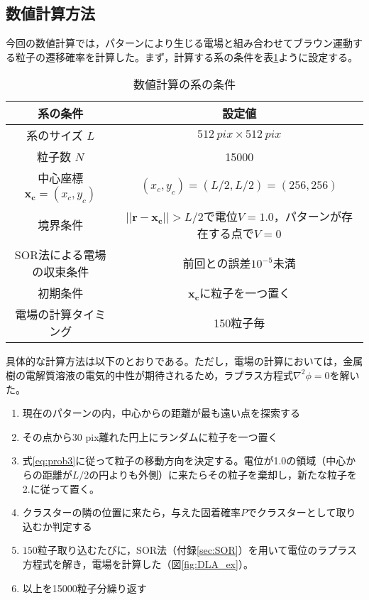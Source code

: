 \documentclass[autodetect-engine,dvi=dvipdfmx,a4paper,ja=standard,oneside,openany,11pt,draft]{bxjsbook}
\begin{document}
\subsection{数値計算方法}
今回の数値計算では，パターンにより生じる電場と組み合わせてブラウン運動する粒子の遷移確率を計算した。まず，計算する系の条件を表\ref{tab:condition}ように設定する。
\begin{table}[htbp]
  \centering
  \caption{数値計算の系の条件　}
  \begin{tabular}{|c||c|}
    \hline
    系の条件                      & 設定値                                                  \\ \hline\hline
    系のサイズ $L$                 & $\SI{512}{pix}\times\SI{512}{pix}$                   \\ \hline
    粒子数 $N$                   & 15000                                                \\ \hline
    中心座標 $\bm{x_c}=(x_c,y_c)$ & $(x_c,y_c)=(L/2,L/2)=(256,256)$                      \\ \hline
    境界条件                      & $||\bm{r}-\bm{x_c}||>L/2$で電位$V=1.0$，パターンが存在する点で$V=0$ \\ \hline
    SOR法による電場の収束条件            & 前回との誤差$10^{-5}$未満                                    \\ \hline
    初期条件                      & $\bm{x_c}$に粒子を一つ置く                                   \\ \hline
    電場の計算タイミング                & 150粒子毎                                               \\ \hline
  \end{tabular}
  \label{tab:condition}
\end{table}

具体的な計算方法は以下のとおりである。ただし，電場の計算においては，金属樹の電解質溶液の電気的中性が期待されるため，ラプラス方程式$\nabla^2\phi=0$を解いた。
\begin{samepage}
  \begin{enumerate}
    \item 現在のパターンの内，中心からの距離が最も遠い点を探索する
    \item その点から30 pix離れた円上にランダムに粒子を一つ置く
    \item 式\ref{eq:prob3}に従って粒子の移動方向を決定する。電位が1.0の領域（中心からの距離が$L/2$の円よりも外側）に来たらその粒子を棄却し，新たな粒子を2.に従って置く。
    \item クラスターの隣の位置に来たら，与えた固着確率$P$でクラスターとして取り込むか判定する
    \item $150$粒子取り込むたびに，SOR法（付録\ref{sec:SOR}）を用いて電位のラプラス方程式を解き，電場を計算した（図\ref{fig:DLA_ex}）。
    \item 以上を15000粒子分繰り返す
  \end{enumerate}
\end{samepage}
\end{document}
